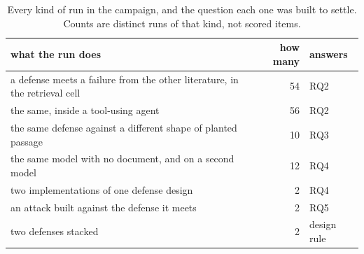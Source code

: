 \begin{table}[t]
\centering
\caption{Every kind of run in the campaign, and the question each one was built to settle. Counts are distinct runs of that kind, not scored items.}
\label{tab:experiments}
\small
\begin{tabular}{@{}>{\raggedright\arraybackslash}p{}rl@{}}
\toprule
what the run does & how many & answers \\
\midrule
a defense meets a failure from the other literature, in the retrieval cell & 54 & RQ2 \\
the same, inside a tool-using agent & 56 & RQ2 \\
the same defense against a different shape of planted passage & 10 & RQ3 \\
the same model with no document, and on a second model & 12 & RQ4 \\
two implementations of one defense design & 2 & RQ4 \\
an attack built against the defense it meets & 2 & RQ5 \\
two defenses stacked & 2 & design rule \\
\bottomrule
\end{tabular}
\end{table}
